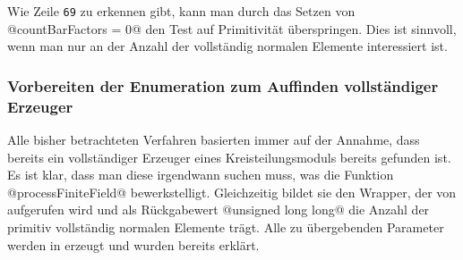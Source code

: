 \begin{bemerkung}
  \label{bem:kein_test_auf_primitivitaet}
  Wie Zeile \texttt{69} zu erkennen gibt, kann man durch das Setzen von
  @countBarFactors = 0@ den Test auf Primitivität überspringen. Dies ist
  sinnvoll, wenn man nur an der Anzahl der vollständig normalen Elemente
  interessiert ist.
\end{bemerkung}


\subsubsection{Vorbereiten der Enumeration zum Auffinden vollständiger
  Erzeuger}

Alle bisher betrachteten Verfahren basierten immer auf der Annahme, dass
bereits ein vollständiger Erzeuger eines Kreisteilungsmoduls bereits gefunden
ist. Es ist klar, dass man diese irgendwann suchen muss, was die Funktion
@processFiniteField@ bewerkstelligt. Gleichzeitig bildet sie den Wrapper, der
von \sage aufgerufen wird und als Rückgabewert @unsigned long long@ die Anzahl
der primitiv vollständig normalen Elemente trägt. Alle zu übergebenden
Parameter werden in \sage erzeugt und wurden bereits erklärt.



